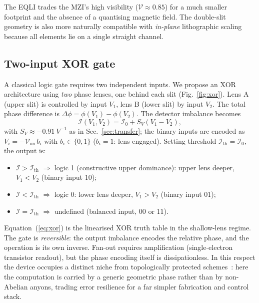 \documentclass[11pt,a4paper]{article}
\begin{document}
The EQLI trades the MZI's high visibility ($\mathcal{V}\approx 0.85$) for a 
much smaller footprint and the absence of a quantising magnetic field. The 
double-slit geometry is also more naturally compatible with \emph{in-plane} 
lithographic scaling because all elements lie on a single straight channel.

\subsection{Two-input XOR gate}
\label{sec:xor}

A classical logic gate requires two independent inputs. We propose an XOR 
architecture using \emph{two} phase lenses, one behind each slit 
(Fig.~\ref{fig:xor}). Lens A (upper slit) is controlled by input $V_1$, lens 
B (lower slit) by input $V_2$. The total phase difference is 
$\Delta\phi = \phi(V_1) - \phi(V_2)$. The detector imbalance becomes
\begin{equation}
\mathcal{I}(V_1,V_2) = \mathcal{I}_0 + S_V(V_1 - V_2),
\label{eq:xor}
\end{equation}
with $S_V\approx\SI{-0.91}{V^{-1}}$ as in Sec.~\ref{sec:transfer}; the binary 
inputs are encoded as $V_i=-\mathcal{V}_{\text{on}}\,b_i$ with $b_i\in\{0,1\}$ 
($b_i=1$: lens engaged). Setting threshold $\mathcal{I}_{\text{th}}=\mathcal{I}_0$, 
the output is:
\begin{itemize}
  \item $\mathcal{I}>\mathcal{I}_{\text{th}}$ $\Rightarrow$ logic 1 (constructive 
  upper dominance): upper lens deeper, $V_1<V_2$ (binary input $10$);
  \item $\mathcal{I}<\mathcal{I}_{\text{th}}$ $\Rightarrow$ logic 0: lower lens 
  deeper, $V_1>V_2$ (binary input $01$);
  \item $\mathcal{I}=\mathcal{I}_{\text{th}}$ $\Rightarrow$ undefined (balanced 
  input, $00$ or $11$).
\end{itemize}

Equation~(\ref{eq:xor}) is the linearised XOR truth table in the shallow-lens 
regime. The gate is \emph{reversible}: the output imbalance encodes the 
relative phase, and the operation is its own inverse. Fan-out requires 
amplification (single-electron transistor readout), but the phase encoding 
itself is dissipationless. In this respect the device occupies a distinct 
niche from topologically protected schemes~\cite{nayak2008}: here the 
computation is carried by a generic geometric phase rather than by non-Abelian 
anyons, trading error resilience for a far simpler fabrication and control
stack.
\end{document}

